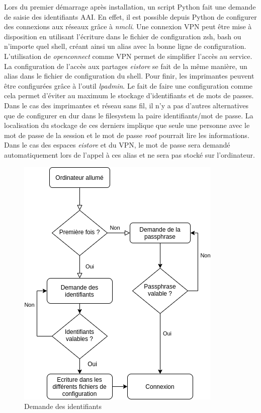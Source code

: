 Lors du premier démarrage après installation, un script Python fait une demande de saisie des identifiants AAI.
En effet, il est possible depuis Python de configurer des connexions aux réseaux grâce à \textit{nmcli}\cite{nmcli}.
Une connexion VPN peut être mise à disposition en utilisant l'écriture dans le fichier de configuration zsh, bash ou n'importe quel shell, créant ainsi un alias avec la bonne ligne de configuration.
L'utilisation de \textit{openconnect} comme VPN permet de simplifier l'accès au service.
La configuration de l'accès aux partages \textit{eistore} se fait de la même manière, un alias dans le fichier de configuration du shell.
Pour finir, les imprimantes peuvent être configurées grâce à l'outil \textit{lpadmin}. 
\newline
Le fait de faire une configuration comme cela permet d'éviter au maximum le stockage d'identifiants et de mots de passes.
Dans le cas des imprimantes et réseau sans fil, il n'y a pas d'autres alternatives que de configurer en dur dans le \gls{filesystem} la paire identifiants/mot de passe.
La localisation du stockage de ces derniers implique que seule une personne avec le mot de passe de la session et le mot de passe \textit{root} pourrait lire les informations.
Dans le cas des espaces \textit{eistore} et du VPN, le mot de passe sera demandé automatiquement lors de l'appel à ces alias et ne sera pas stocké sur l'ordinateur. 

\begin{figure}[H]
	\centering
	\includegraphics[scale=0.5]{images/centralisation.png}
	\caption{Demande des identifiants}
	\label{fig:central}
\end{figure}


